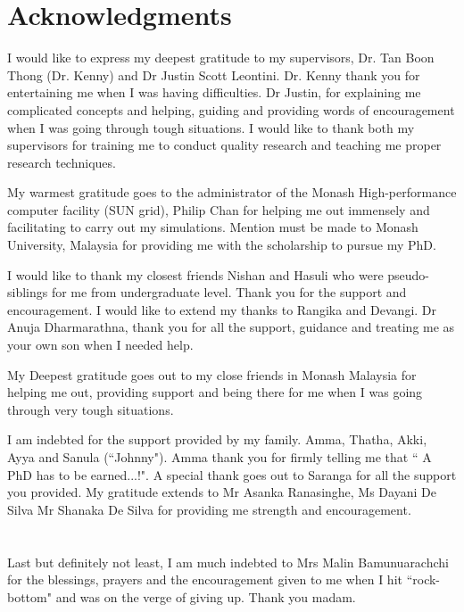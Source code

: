 \chapter*{Acknowledgments}

I would like to express my deepest gratitude to my supervisors, Dr. Tan Boon Thong (Dr. Kenny) and Dr Justin Scott Leontini. Dr. Kenny thank you for entertaining me when I was having difficulties. Dr Justin, for explaining me complicated concepts and helping, guiding and providing words of encouragement when I was going through tough situations. I would like to thank both my supervisors for training me to conduct quality research and teaching me proper research techniques.

My warmest gratitude goes to the administrator of the Monash High-performance computer facility (SUN grid), Philip Chan for helping me out immensely and facilitating to carry out my simulations. Mention must be made to Monash University, Malaysia for providing me with the scholarship to pursue my PhD. 
 
I would like to thank my closest friends Nishan and Hasuli who were pseudo-siblings for me from undergraduate level. Thank you for the support and encouragement. I would like to extend my thanks to Rangika and Devangi. Dr Anuja Dharmarathna, thank you for all the support, guidance and treating me as your own son when I needed help.

My Deepest gratitude goes out to my close friends in Monash Malaysia for helping me out, providing support and being there for me when I was going through very tough situations. 

I am indebted for the support provided by my family. Amma, Thatha, Akki, Ayya and Sanula (``Johnny"). Amma thank you for firmly telling me that `` A PhD has to be earned...!". A special thank goes out to Saranga for all the support you provided. My gratitude extends to Mr Asanka Ranasinghe, Ms Dayani De Silva Mr Shanaka De Silva for providing me strength and encouragement.
\\
\\
\\
Last but definitely not least, I am much indebted to Mrs Malin Bamunuarachchi for the blessings, prayers and the encouragement given to me when I hit ``rock-bottom"  and was on the verge of giving up. Thank you madam.    

 

  

  